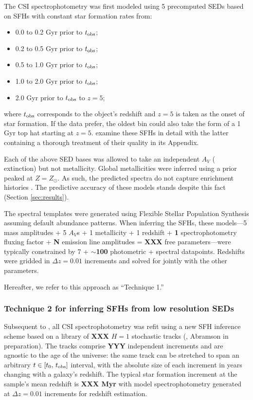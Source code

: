 \documentclass[a4paper,fleqn,usenatbib]{mnras}
\newcommand{\bfr}{\bf\color{red}}
\newcommand{\tobs}{t_{\rm obs}}
\newcommand{\bitem}{\begin{itemize}}
\newcommand{\eitem}{\end{itemize}}
\begin{document}
The CSI spectrophotometry was first modeled using 5 precomputed SEDs based on SFHs with 
constant star formation rates from:
\bitem
	\item 0.0 to 0.2 Gyr prior to $\tobs$;
	\item 0.2 to 0.5 Gyr prior to $\tobs$;
	\item 0.5 to 1.0 Gyr prior to $\tobs$;
	\item 1.0 to 2.0 Gyr prior to $\tobs$;
	\item 2.0 Gyr prior to $\tobs$ to $z=5$;
\eitem
where $\tobs$ corresponds to the object's redshift and $z=5$ is taken as the onset of star formation. If 
the data prefer, the oldest bin could also take the form of a 1 Gyr top hat starting at $z=5$. 
\citet{Dressler16, Dressler18} examine these SFHs in detail with the latter containing a thorough 
treatment of their quality in its Appendix.

Each of the above SED bases was allowed to take an independent $A_{V}$ (\citealt{Calzetti00} 
extinction) but not metallicity. Global metallicities were inferred using a prior peaked at 
$Z=Z_{\odot}$. As such, the predicted spectra do not capture enrichment histories 
\citep[cf.][]{Pacifici12, Morishita19}. The predictive accuracy of these models stands despite this fact (Section \ref{sec:results}).

The spectral templates were generated using Flexible Stellar Population Synthesis 
\citep[FSPS;][]{ConroyGunnWhite09} assuming default abundance patterns. When inferring the SFHs, 
these models---5 mass amplitudes + 5 $A_{V}$s + 1 metallicity + 1 redshift + {\bfr 1} spectrophotometry fluxing 
factor + {\bfr N} emission line amplitudes = {\bfr XXX} free parameters---were typically constrained by 
7 + {\bfr $\sim$100} photometric + spectral datapoints. Redshifts were gridded in {\bfr $\Delta z = 0.01$} 
increments and solved for jointly with the other parameters.

Hereafter, we refer to this approach as ``Technique 1.''

\subsubsection{Technique 2 for inferring SFHs from low resolution SEDs}
\label{sec:h1}

Subsequent to \citet{Dressler18}, all CSI spectrophotometry was refit using a new 
SFH inference scheme based on a library of {\bfr XXX} $H=1$ stochastic tracks
(\citealt{Kelson14,Kelson16,Kelson19}, Abramson in preparation). The tracks comprise {\bfr YYY} 
independent increments and are agnostic to the age of the universe: the same track can be stretched 
to span an arbitrary $t\in[t_{0},\,\tobs]$ interval, with the absolute size of each increment in years 
changing with a galaxy's redshift. The typical star formation increment at the sample's mean redshift 
is {\bfr XXX Myr} with model spectrophotometry generated at {\bfr $\Delta z = 0.01$} increments for
redshift estimation.
\end{document}
